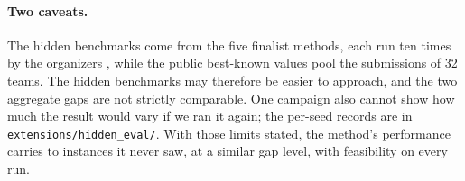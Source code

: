 \documentclass[11pt]{article}
\begin{document}
	\paragraph{Two caveats.} The hidden benchmarks come from the five finalist methods, each run
	ten times by the organizers \citep{ihtc2024paper}, while the public best-known values pool the
	submissions of 32 teams. The hidden benchmarks may therefore be easier to approach, and the two aggregate gaps
	are not strictly comparable. One campaign also cannot show how much the result would vary if we ran it again; the per-seed records are in \texttt{extensions/hidden\_eval/}. With those limits stated, the method's performance carries to instances it never saw, at a similar gap level, with feasibility on every run.

	
\end{document}
